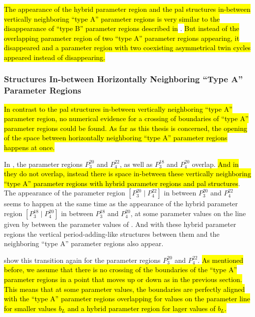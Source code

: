 \hl{The appearance of the hybrid parameter region and the \gls{pal} structures in-between vertically neighboring ``type A'' parameter regions is very similar to the disappearance of ``type B'' parameter regions described in} .
\hl{
	But instead of the overlapping parameter region of two ``type A'' parameter regions appearing, it disappeared and a parameter region with two coexisting asymmetrical twin cycles appeared instead of disappearing.
}

\subsubsection{ Structures In-between Horizontally Neighboring ``Type A'' Parameter Regions}
\label{sec:add.change.appa.vert}

\hl{
	In contrast to the \gls{pal} structures in-between vertically neighboring ``type A'' parameter region, no numerical evidence for a crossing of boundaries of ``type A'' parameter regions could be found.
	As far as this thesis is concerned, the opening of the space between horizontally neighboring ``type A'' parameter regions happens at once.
}

In , the parameter regions $P^{20}_3$ and $P^{22}_4$, as well as $P^{18}_3$ and $P^{20}_4$ overlap.
\hl{And in}  \hl{they do not overlap, instead there is space in-between these vertically neighboring ``type A'' parameter regions with hybrid parameter regions and \gls{pal} structures}.
The appearance of the parameter region $\left[P^{20}_3 \mid P^{22}_4\right]$ in between $P^{20}_3$ and $P^{22}_4$ seems to happen at the same time as the appearance of the hybrid parameter region $\left[P^{18}_3 \mid P^{20}_4\right]$ in between $P^{18}_3$ and $P^{20}_4$, at some parameter values on the line given by  between the parameter values of .
And with these hybrid parameter regions the vertical period-adding-like structures between them and the neighboring ``type A'' parameter regions also appear.

 show this transition again for the parameter regions $P^{20}_3$ and $P^{22}_4$.
\hl{
	As mentioned before, we assume that there is no crossing of the boundaries of the ``type A'' parameter regions in a point that moves up or down as in the previous section.
	This means that at some parameter values, the boundaries are perfectly aligned with the ``type A'' parameter regions overlapping for values on the parameter line for smaller values $b_L$ and a hybrid parameter region for lager values of $b_L$.
}

